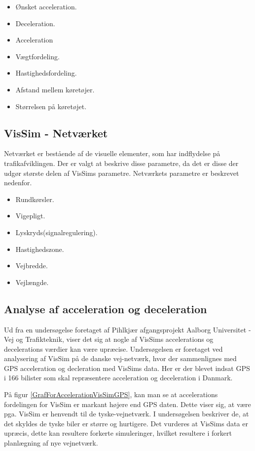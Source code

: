 \begin{itemize}
\item Ønsket acceleration.
\item Deceleration.
\item Acceleration
\item Vægtfordeling.
\item Hastighedsfordeling.
\item Afstand mellem køretøjer.
\item Størrelsen på køretøjet.
\end{itemize}

\subsection{VisSim - Netværket}
Netværket er bestående af de visuelle elementer, som har indflydelse på trafikafviklingen. Der er valgt at beskrive disse parametre, da det er disse der udgør største delen af VisSims parametre.
Netværkets parametre er beskrevet nedenfor.

\begin{itemize}
\item Rundkørsler.
\item Vigepligt.
\item Lyskryds(signalregulering).
\item Hastighedszone.
\item Vejbredde.
\item Vejlængde.
\end{itemize}

\subsection{Analyse af acceleration og deceleration}
Ud fra en undersøgelse foretaget af Pihlkjær afgangsprojekt Aalborg Universitet - Vej og Trafikteknik, viser det sig at nogle af VisSims accelerations og decelerations værdier kan være upræcise. Undersøgelsen er foretaget ved analysering af VisSim på de danske vej-netværk, hvor der sammenlignes med GPS acceleration og decleration med VisSims data. Her er der blevet indsat GPS i 166 bilister som skal repræsentere acceleration og deceleration i Danmark.

På figur \ref{GrafForAccelerationVisSimGPS}, kan man se at accelerations fordelingen for VisSim er markant højere end GPS daten. Dette viser sig, at være pga. VisSim er henvendt til de tyske-vejnetværk. I undersøgelsen beskriver de, at det skyldes de tyske biler er større og hurtigere. Det vurderes at VisSims data er upræcis, dette kan resultere forkerte simuleringer, hvilket resultere i forkert planlægning af nye vejnetværk. 


